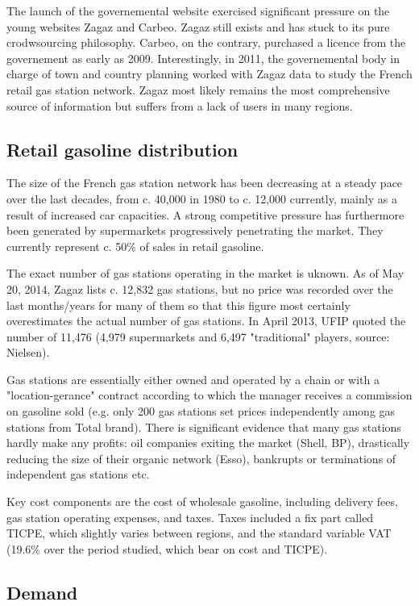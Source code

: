\documentclass[11pt]{article}
\begin{document}
The launch of the governemental website exercised significant pressure on the young websites Zagaz and Carbeo. Zagaz still exists and has stuck to its pure crodwsourcing philosophy. Carbeo, on the contrary, purchased a licence from the governement as early as 2009. Interestingly, in 2011, the governemental body in charge of town and country planning worked with Zagaz data to study the French retail gas station network. Zagaz most likely remains the most comprehensive source of information but suffers from a lack of users in many regions.

\subsection{Retail gasoline distribution}

The size of the French gas station network has been decreasing at a steady pace over the last decades, from c. 40,000 in 1980 to c. 12,000 currently, mainly as a result of increased car capacities.  A strong competitive pressure has furthermore been generated by supermarkets progressively penetrating the market. They currently represent c. 50\% of sales in retail gasoline.

The exact number of gas stations operating in the market is uknown. As of May 20, 2014, Zagaz lists c. 12,832 gas stations, but no price was recorded over the last months/years for many of them so that this figure most certainly overestimates the actual number of gas stations. In April 2013, UFIP quoted the number of 11,476 (4,979 supermarkets and 6,497 "traditional" players, source: Nielsen).

Gas stations are essentially either owned and operated by a chain or with a "location-gerance" contract according to which the manager receives a commission on gasoline sold (e.g. only 200 gas stations set prices independently among gas stations from Total brand). There is significant evidence that many gas stations hardly make any profits: oil companies exiting the market (Shell, BP), drastically reducing the size of their organic network (Esso), bankrupts or terminations of independent gas stations etc.

Key cost components are the cost of wholesale gasoline, including delivery fees,  gas station operating expenses, and taxes. Taxes included a fix part called TICPE, which slightly varies between regions, and the standard variable VAT (19.6\% over the period studied, which bear on cost and TICPE).

\subsection{Demand}
\end{document}
